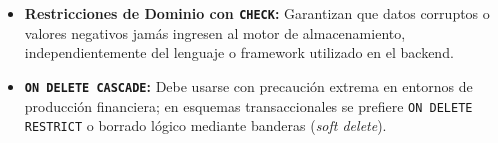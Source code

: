 \begin{engtip}
\begin{itemize}
    \item \textbf{Restricciones de Dominio con \texttt{CHECK}:} Garantizan que datos corruptos o valores negativos jam\'as ingresen al motor de almacenamiento, independientemente del lenguaje o framework utilizado en el backend.
    \item \textbf{\texttt{ON DELETE CASCADE}:} Debe usarse con precauci\'on extrema en entornos de producci\'on financiera; en esquemas transaccionales se prefiere \texttt{ON DELETE RESTRICT} o borrado l\'ogico mediante banderas (\textit{soft delete}).
\end{itemize}
\end{engtip}
